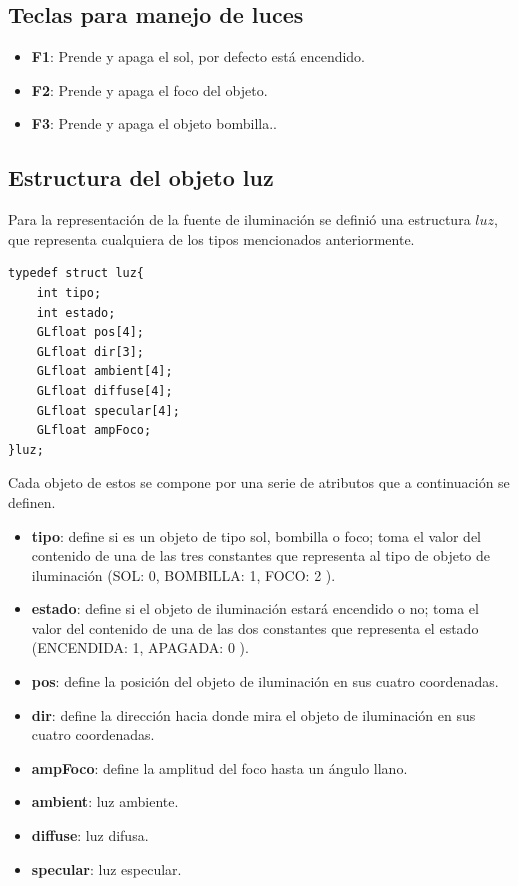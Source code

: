 \documentclass[12pt,a4paper]{article}
\begin{document}
\subsection{Teclas para manejo de luces}

\begin{itemize}
\item \textbf{F1}: Prende y apaga el sol, por defecto está encendido.
\item \textbf{F2}: Prende y apaga el foco del objeto.
\item \textbf{F3}: Prende y apaga el objeto bombilla..
\end{itemize}

\subsection{Estructura del objeto luz}

Para la representación de la fuente de iluminación se definió una estructura $luz$, que representa cualquiera de los tipos mencionados anteriormente. 

\begin{lstlisting}
typedef struct luz{
    int tipo;
    int estado;
    GLfloat pos[4];
    GLfloat dir[3];
    GLfloat ambient[4];
    GLfloat diffuse[4];
    GLfloat specular[4];
    GLfloat ampFoco;
}luz;
\end{lstlisting}

Cada objeto de estos se compone por una serie de atributos que a continuación se definen.

\begin{itemize}
\item \textbf{tipo}: define si es un objeto de tipo sol, bombilla o foco; toma el valor del contenido de una de las tres constantes que representa al tipo de objeto de iluminación (SOL: 0, BOMBILLA: 1, FOCO: 2 ). 
\item \textbf{estado}: define si el objeto de iluminación estará encendido o no; toma el valor del contenido de una de las dos constantes que representa el estado (ENCENDIDA: 1, APAGADA: 0 ). 
\item \textbf{pos}: define la posición del objeto de iluminación en sus cuatro coordenadas. 
\item \textbf{dir}: define la dirección hacia donde mira el objeto de iluminación en sus cuatro coordenadas.
\item \textbf{ampFoco}: define la amplitud del foco hasta un ángulo llano.
\item \textbf{ambient}: luz ambiente.
\item \textbf{diffuse}: luz difusa.
\item \textbf{specular}: luz especular.
\end{itemize}
\end{document}

